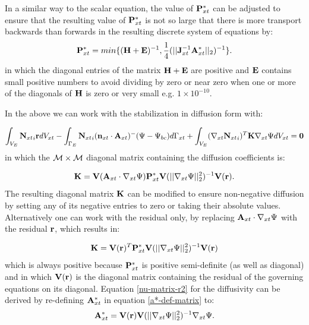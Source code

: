  In a similar way to the scalar equation, the value of 
${\bf P}_{xt}^*$ can be adjusted to ensure 
that the resulting value of ${\bf P}_{xt}^* $
is not so large that there is 
more transport backwards than forwards in the resulting discrete
system of equations by: 
\begin{equation}
 {\bf P}_{xt}^* = min\{ ({\bf H}+{\bf E})^{-1}, 
 \frac{1}{4} (\vert\vert {\bf J}_{xt}^{-1} {\bf A}_{xt}^* \vert\vert_2 )^{-1} \}.  
\label{p*-def-j-lim} 
\end{equation}   
in which the diagonal entries of the matrix ${\bf H}+{\bf E}$ are positive and ${\bf E}$ 
contains small positive numbers to avoid dividing by zero or near zero 
when one or more of the 
diagonals of ${\bf H}$ is zero or very small e.g. $1\times 10^{-10}$. 
 
In the above we can work with the stabilization in diffusion form with: 
 
 
\begin{equation}
 \int_{V_E}
 {{\bf N}_{xt}}_i {\bf r} d V_{xt} 
 - \int_{\Gamma_E} {{\bf N}_{xt}}_i ({\bf n}_{xt} \cdot {\bf A}_{xt})^-  (\Psi-\Psi_{bc}) 
 d \Gamma_{xt} 
 +
  \int_{V_E} ({\nabla_{xt}} {{\bf N}_{xt}}_i )^T {\bf K}  {\nabla_{xt}} \Psi d V_{xt} 
 ={\bf 0}
\label{disc-xt-matrix} 
\end{equation} 
 in which the ${\cal M}\times {\cal M}$ diagonal matrix containing 
 the diffusion coefficients is: 
 
\begin{equation}
 {\bf K} = {{\bf V}({\bf A}_{xt}\cdot {\nabla_{xt}} \Psi) {\bf P}_{xt}^* }{\bf V}({\vert\vert {\nabla_{xt}} \Psi \vert\vert^2_2})^{-1} {\bf V}({\bf r}).  
\label{nu-matrix} 
\end{equation} 
The resulting diagonal matrix ${\bf K}$ can be modified to ensure 
non-negative diffusion 
by setting any of its negative entries to zero 
or taking their absolute values. 
Alternatively one can work with the residual only, by 
 replacing ${\bf A}_{xt}\cdot {\nabla_{xt}} \Psi$ with the residual ${\bf r}$,  
 which results in: 
 
\begin{equation}
 {\bf K} = {{\bf V}({\bf r})^T {\bf P}_{xt}^* 
 {\bf V}({\vert\vert {\nabla_{xt}} \Psi \vert\vert^2_2})^{-1} {\bf V}({\bf r})}
\label{nu-matrix-r2} 
\end{equation} 
 which is always positive because ${\bf P}_{xt}^*$ is positive semi-definite 
 (as well as diagonal) 
 and in which ${\bf V}({\bf r})$ is the diagonal matrix 
 containing the residual of the governing equations on its diagonal. 
 Equation \ref{nu-matrix-r2} for the diffusivity can be derived by 
 re-defining ${\bf A}_{xt}^*$ in equation \ref{a*-def-matrix} to:
\begin{equation}
 {\bf A}_{xt}^* = {{\bf V}({\bf r})}
 {\bf V}({\vert\vert{\nabla_{xt}} \Psi\vert\vert^2_2})^{-1} {\nabla_{xt}} \Psi. 
\label{a*-def-matrix-r} 
\end{equation}



